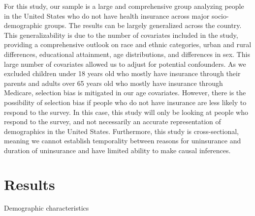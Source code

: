 \documentclass[12pt]{article}
\begin{document}
For this study, our sample is a large and comprehensive group analyzing people in the United States who do not have health insurance across major socio-demographic groups. The results can be largely generalized across the country. This generalizability is due to the number of covariates included in the study, providing a comprehensive outlook on race and ethnic categories, urban and rural differences, educational attainment, age distributions, and differences in sex. This large number of covariates allowed us to adjust for potential confounders. As we excluded children under 18 years old who mostly have insurance through their parents and adults over 65 years old who mostly have insurance through Medicare, selection bias is mitigated in our age covariates. However, there is the possibility of selection bias if people who do not have insurance are less likely to respond to the survey. In this case, this study will only be looking at people who respond to the survey, and not necessarily an accurate representation of demographics in the United States. Furthermore, this study is cross-sectional, meaning we cannot establish temporality between reasons for uninsurance and duration of uninsurance and have limited ability to make causal inferences.



\newpage
\section{Results}

\newpage
\begin{table}[H]
  \vspace*{-1.5cm}
  \hspace*{-1cm} 
  \centering
  \caption{Demographic characteristics}
\end{table}
\end{document}
